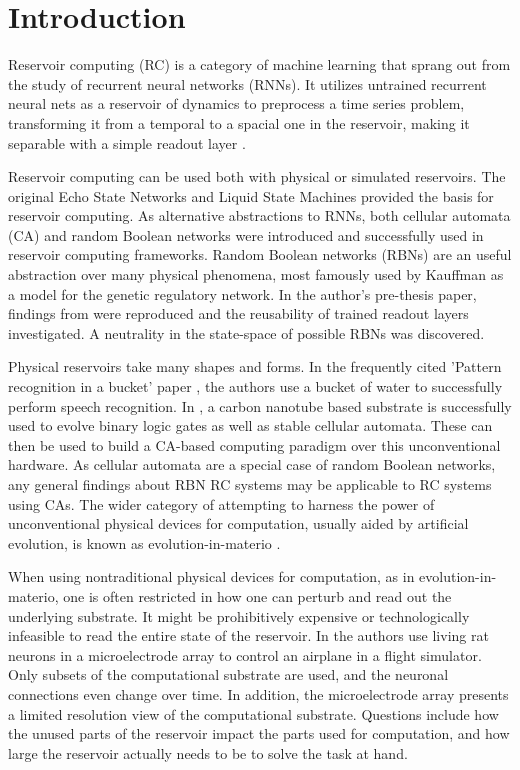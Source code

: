 \chapter{Introduction}

Reservoir computing (RC) is a category of machine learning that sprang out from the study of recurrent neural networks (RNNs).
It utilizes untrained recurrent neural nets as a reservoir of dynamics to preprocess a time series problem,
transforming it from a temporal to a spacial one in the reservoir,
making it separable with a simple readout layer \cite{lukovsevivcius2012reservoir}.

Reservoir computing can be used both with physical or simulated reservoirs.
The original Echo State Networks \cite{jaeger2002adaptive} and Liquid State Machines \cite{natschlager2002liquid} provided the basis for reservoir computing.
As alternative abstractions to RNNs,
both cellular automata (CA) \cite{yilmaz2014reservoir} and random Boolean networks \cite{rbn-reservoir} were introduced and successfully used in reservoir computing frameworks.
Random Boolean networks (RBNs) \cite{gershenson2004introduction} are an useful abstraction over many physical phenomena,
most famously used by Kauffman \cite{kauffman1969metabolic} as a model for the genetic regulatory network.
In the author's pre-thesis paper,
findings from \cite{rbn-reservoir} were reproduced and the reusability of trained readout layers investigated.
A neutrality in the state-space of possible RBNs was discovered.

Physical reservoirs take many shapes and forms.
In the frequently cited 'Pattern recognition in a bucket' paper \cite{fernando2003pattern},
the authors use a bucket of water to successfully perform speech recognition.
In \cite{farstad2015evolving},
a carbon nanotube based substrate is successfully used to evolve binary logic gates as well as stable cellular automata.
These can then be used to build a CA-based computing paradigm over this unconventional hardware.
As cellular automata are a special case of random Boolean networks,
any general findings about RBN RC systems may be applicable to RC systems using CAs.
The wider category of attempting to harness the power of unconventional physical devices for computation,
usually aided by artificial evolution,
is known as evolution-in-materio \cite{miller2002evolution}.

When using nontraditional physical devices for computation, as in evolution-in-materio,
one is often restricted in how one can perturb and read out the underlying substrate.
It might be prohibitively expensive or technologically infeasible to read the entire state of the reservoir.
In \cite{demarse2005adaptive} the authors use living rat neurons in a microelectrode array to control an airplane in a flight simulator.
Only subsets of the computational substrate are used,
and the neuronal connections even change over time.
In addition, the microelectrode array presents a limited resolution view of the computational substrate.
Questions include how the unused parts of the reservoir impact the parts used for computation,
and how large the reservoir actually needs to be to solve the task at hand.


